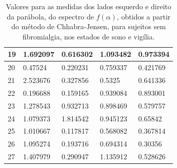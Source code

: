 \documentclass{ufscThesis}
\begin{document}
\begin{table}[h]
\begin{tabular}{|l|l|l|l|l|}
19  & 1.692097      & 0.616302      & 1.093482     & 0.973394      \\ \hline
20  & 0.47524       & 0.220231      & 0.759337     & 0.421769      \\ \hline
21  & 2.523676      & 0.327856      & 0.5325       & 0.641336      \\ \hline
22  & 0.196688      & 0.159165      & 0.939084     & 0.893001      \\ \hline
23  & 1.278543      & 0.932713      & 0.898469     & 0.579757      \\ \hline
24  & 1.079373      & 1.814542      & 0.945123     & 0.65842       \\ \hline
25  & 1.010667      & 0.117817      & 0.568082     & 0.367814      \\ \hline
26  & 1.095274      & 0.193716      & 0.694314     & 0.30356       \\ \hline
27  & 1.407979      & 0.290947      & 1.135912     & 0.528626      \\ \hline
\end{tabular}
\caption{Valores para as medidas dos lados esquerdo e direito da parábola, do espectro de $f(\alpha)$, obtidos a partir do método de Chhabra-Jensen, para sujeitos sem fibromialgia, nos estados de sono e vigília.}
\label{tab_lados_hm}
\end{table}
\end{document}
